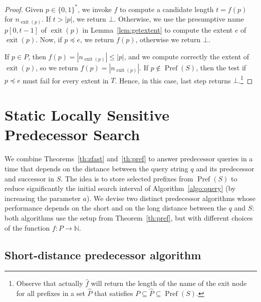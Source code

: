 \documentclass[a4paper,11pt]{article}
\newcommand{\N}{\mathbb{N}}
\newcommand{\?}{\mskip1.5mu}
\DeclareMathOperator{\exit}{exit}
\DeclareMathOperator{\Pref}{Pref}
\begin{document}
\begin{proof}
Given $p \in \{0, 1\}^*$, we invoke
$f$ to compute a candidate length $t = f(p)$ 
for $n_{\exit(p)}$.
If $t > |p|$, we return $\bot$.
Otherwise,  we use the presumptive
name $p[0, t - 1]$ of $\exit(p)$ 
in Lemma~\ref{lem:getextent} to compute 
the extent $e$ of $\exit(p)$. Now, 
if $p  \preceq e$, we return $f(p)$, otherwise we return $\bot$.

If $p\in P$, then $f(p) = |n_{\exit(p)}| \leq |p|$, and we
compute correctly the extent of $\exit(p)$, so we return 
$f(p)=|n_{\exit(p)}|$.
If $p \not\in \Pref(S)$, then the test if 
$p \preceq e$ must fail for every extent in $T$. 
Hence, in this case, last step returns $\bot$.\footnote{Observe 
that actually $\widehat f$ will return the length 
of the name of the exit node for all prefixes in a set $\hat P$ that 
satisfies $P\subseteq \hat P\subseteq\Pref(S)$.}
\end{proof}

\section{Static Locally Sensitive Predecessor Search}
\label{sec:pred}

We combine Theorems~\ref{th:zfast} and~\ref{th:pref} 
to answer predecessor queries in a time that depends 
on the distance between the query string $q$ and its 
predecessor and successor in $S$. The idea 
is to store selected prefixes from $\Pref(S)$
to reduce significantly the initial search interval of
Algorithm~\ref{algo:query} (by increasing the parameter $a$).
We devise two distinct predecessor algorithms whose 
performance depends on the short and on the
long distance between the $q$ and $S$:
both algorithms use the setup from Theorem~\ref{th:pref}, but with 
different choices of the function $f:P\to \N$. 

\subsection{Short-distance predecessor algorithm}
\label{sec:short-distance}
\end{document}
